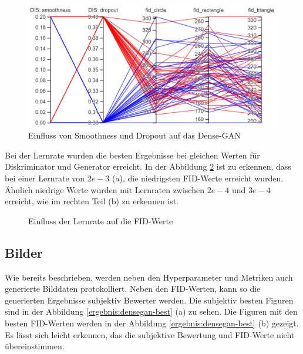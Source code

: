 \begin{figure}[H]
	\centering
	\includegraphics[width=0.6\textheight]{kapitel/5_ergebnisse/densegan/hyperparameter_dropout_smooth.PNG}
	\caption{Einfluss von Smoothness und Dropout auf das Dense-GAN}
	\label{ergebnis:densegan-hyper-smoot-drop}
\end{figure}

Bei der Lernrate wurden die besten Ergebnisse bei gleichen Werten für Diskriminator und Generator erreicht.  
In der Abbildung \ref{ergebnis:densegan-lr} ist zu erkennen, dass bei einer Lernrate von \(2e-3\) (a), die niedrigsten FID-Werte erreicht wurden.
Ähnlich niedrige Werte wurden mit Lernraten zwischen \(2e-4\) und \(3e-4\) erreicht, wie im rechten Teil (b) zu erkennen ist.
 
 \begin{figure}[H]
 	\centering
 	\qquad
 	\caption{Einfluss der Lernrate auf die FID-Werte}
 	\label{ergebnis:densegan-lr}
 \end{figure}

\subsection{Bilder}
Wie bereits beschrieben, werden neben den Hyperparameter und Metriken auch generierte Bilddaten protokolliert.
Neben den FID-Werten, kann so die generierten Ergebnisse subjektiv Bewerter werden.
Die subjektiv besten Figuren sind in der Abbildung \ref{ergebnis:densegan-best} (a) zu sehen.
Die Figuren mit den besten FID-Werten werden in der Abbildung  \ref{ergebnis:densegan-best} (b) gezeigt.
Es lässt sich leicht erkennen, das die subjektive Bewertung und FID-Werte nicht übereinstimmen.

